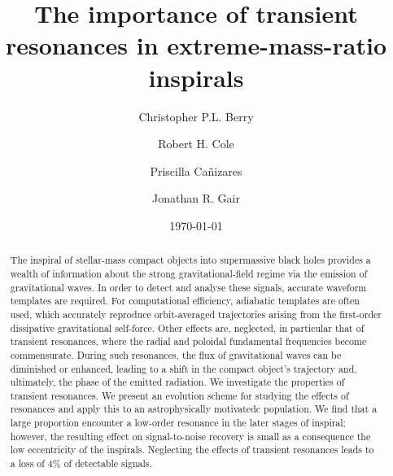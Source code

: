 \documentclass[aps,prd,amsfonts,amssymb,amsmath,nofootinbib,showpacs,superscriptaddress,twocolumn,floatfix]{revtex4-1}
\begin{document}

\title{The importance of transient resonances in extreme-mass-ratio inspirals}

\author{Christopher P.L. Berry}
\author{Robert H. Cole}
\author{Priscilla Ca\~{n}izares}
\author{Jonathan R. Gair}

\date{\today}

\begin{abstract}
The inspiral of stellar-mass compact objects into supermassive black holes provides a wealth of information about the strong gravitational-field regime via the emission of gravitational waves. In order to detect and analyse these signals, accurate waveform templates are required. For computational efficiency, adiabatic templates are often used, which accurately reproduce orbit-averaged trajectories arising from the first-order dissipative gravitational self-force. Other effects are, neglected, in particular that of transient resonances, where the radial and poloidal fundamental frequencies become commensurate. During such resonances, the flux of gravitational waves can be diminished or enhanced, leading to a shift in the compact object's trajectory and, ultimately, the phase of the emitted radiation. We investigate the properties of transient resonances. We present an evolution scheme for studying the effects of resonances and apply this to an astrophysically motivatedc population. We find that a large proportion encounter a low-order resonance in the later stages of inspiral; however, the resulting effect on signal-to-noise recovery is small as a consequence the low eccentricity of the inspirals. Neglecting the effects of transient resonances leads to a loss of $4\%$ of detectable signals.
\end{abstract}

\end{document}
